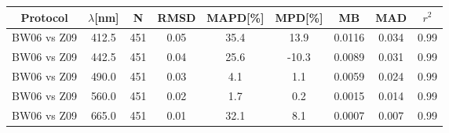 \documentclass[preview]{standalone}
\begin{document}
\small

\begin{table}
\begin{tabular}{ccccccccc}

\hline
Protocol & $\lambda$[nm]  & N     & RMSD  &MAPD[\%]&MPD[\%]& MB     & MAD    & $r^2$ \\\hline


BW06 vs Z09 &       412.5 &  451 &  0.05 &  35.4 &  13.9 &  0.0116 &  0.034 &  0.99 \\
BW06 vs Z09 &       442.5 &  451 &  0.04 &  25.6 & -10.3 &  0.0089 &  0.031 &  0.99 \\
BW06 vs Z09 &       490.0 &  451 &  0.03 &   4.1 &   1.1 &  0.0059 &  0.024 &  0.99 \\
BW06 vs Z09 &       560.0 &  451 &  0.02 &   1.7 &   0.2 &  0.0015 &  0.014 &  0.99 \\
BW06 vs Z09 &       665.0 &  451 &  0.01 &  32.1 &   8.1 &  0.0007 &  0.007 &  0.99 \\

\end{tabular}
\end{table}
\end{document}
